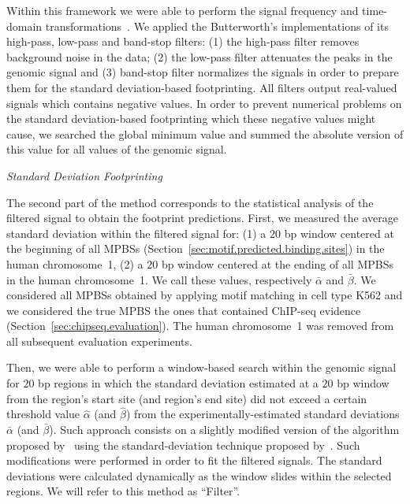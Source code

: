 Within this framework we were able to perform the signal frequency and time-domain transformations~\citep{lutovac2000}. We applied the Butterworth's implementations of its high-pass, low-pass and band-stop filters: (1) the high-pass filter removes background noise in the data; (2) the low-pass filter attenuates the peaks in the genomic signal and (3) band-stop filter normalizes the signals in order to prepare them for the standard deviation-based footprinting. All filters output real-valued signals which contains negative values. In order to prevent numerical problems on the standard deviation-based footprinting which these negative values might cause, we searched the global minimum value and summed the absolute version of this value for all values of the genomic signal.

\vspace{0.5cm}
\noindent
\emph{Standard Deviation Footprinting}
\vspace{0.3cm}

\noindent
The second part of the method corresponds to the statistical analysis of the filtered signal to obtain the footprint predictions. First, we measured the average standard deviation within the filtered signal for: (1) a $20$ bp window centered at the beginning of all MPBSs (Section~\ref{sec:motif.predicted.binding.sites}) in the human chromosome~1, (2) a $20$ bp window centered at the ending of all MPBSs in the human chromosome~1. We call these values, respectively $ \bar{\alpha} $ and $ \bar{\beta} $. We considered all MPBSs obtained by applying motif matching in cell type K562 and we considered the true MPBS the ones that contained ChIP-seq evidence (Section~\ref{sec:chipseq.evaluation}). The human chromosome~1 was removed from all subsequent evaluation experiments.

Then, we were able to perform a window-based search within the genomic signal for $ 20 $ bp regions in which the standard deviation estimated at a $20$ bp window from the region's start site (and region's end site) did not exceed a certain threshold value $ \hat{\alpha} $ (and $ \hat{\beta} $) from the experimentally-estimated standard deviations $ \bar{\alpha} $ (and $ \bar{\beta} $). Such approach consists on a slightly modified version of the algorithm proposed by~\cite{neph2012a} using the standard-deviation technique proposed by~\cite{shenoi2005}. Such modifications were performed in order to fit the filtered signals. The standard deviations were calculated dynamically as the window slides within the selected regions. We will refer to this method as ``Filter''.

